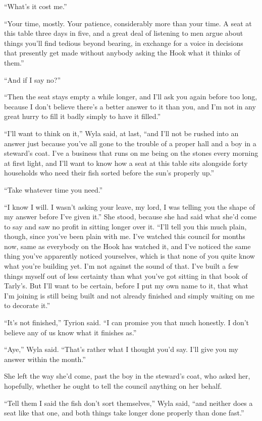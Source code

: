 “What’s it cost me.”

“Your time, mostly. Your patience, considerably more than your time. A seat at this table three days in five, and a great deal of listening to men argue about things you’ll find tedious beyond bearing, in exchange for a voice in decisions that presently get made without anybody asking the Hook what it thinks of them.”

“And if I say no?”

“Then the seat stays empty a while longer, and I’ll ask you again before too long, because I don’t believe there’s a better answer to it than you, and I’m not in any great hurry to fill it badly simply to have it filled.”

\sceneBreak

“I’ll want to think on it,” Wyla said, at last, “and I’ll not be rushed into an answer just because you’ve all gone to the trouble of a proper hall and a boy in a steward’s coat. I’ve a business that runs on me being on the stones every morning at first light, and I’ll want to know how a seat at this table sits alongside forty households who need their fish sorted before the sun’s properly up.”

“Take whatever time you need.”

“I know I will. I wasn’t asking your leave, my lord, I was telling you the shape of my answer before I’ve given it.” She stood, because she had said what she’d come to say and saw no profit in sitting longer over it. “I’ll tell you this much plain, though, since you’ve been plain with me. I’ve watched this council for months now, same as everybody on the Hook has watched it, and I’ve noticed the same thing you’ve apparently noticed yourselves, which is that none of you quite know what you’re building yet. I’m not against the sound of that. I’ve built a few things myself out of less certainty than what you’ve got sitting in that book of Tarly’s. But I’ll want to be certain, before I put my own name to it, that what I’m joining is still being built and not already finished and simply waiting on me to decorate it.”

“It’s not finished,” Tyrion said. “I can promise you that much honestly. I don’t believe any of us know what it finishes as.”

“Aye,” Wyla said. “That’s rather what I thought you’d say. I’ll give you my answer within the month.”

She left the way she’d come, past the boy in the steward’s coat, who asked her, hopefully, whether he ought to tell the council anything on her behalf.

“Tell them I said the fish don’t sort themselves,” Wyla said, “and neither does a seat like that one, and both things take longer done properly than done fast.”